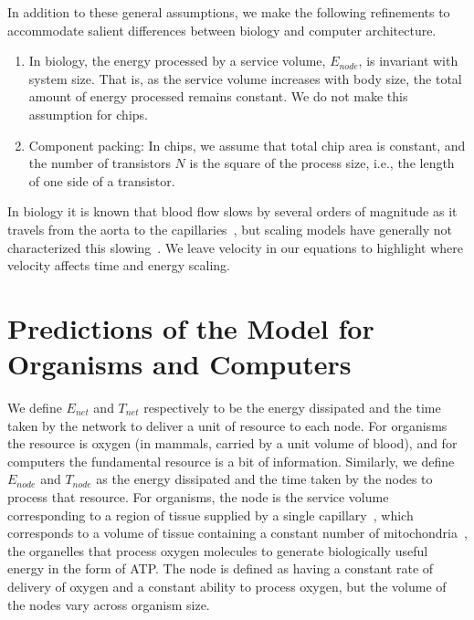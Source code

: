 \documentclass[12pt]{article}
\begin{document}
In addition to these general assumptions, we make the following
refinements to accommodate salient differences between biology and computer architecture.
\begin{enumerate}
\item In biology, the energy processed by a service volume,
  $E_{node}$, is invariant with system size. That is, as the service volume
  increases with body size, the total amount of energy processed
  remains constant.   We do not make this assumption for chips.

\item Component packing: In chips, we assume that total chip area is constant, and the
  number of transistors $N$ is the square of the process size, i.e.,
  the length of one side of a transistor. 

\end{enumerate}

\noindent 

In biology it is known that blood flow slows by several orders of magnitude as
it travels from the aorta to the capillaries~\cite{west97}, but scaling models
have generally not characterized this slowing~\cite{west97, banavar10}. We leave velocity in
our equations to highlight where velocity affects time and energy
scaling.

\section{Predictions of the Model for Organisms and Computers}

We define $E_{net}$ and $T_{net}$ respectively to be the energy dissipated and
the time taken by the network to deliver a unit of resource to each node.  For
organisms the resource is oxygen (in mammals, carried by a unit volume of
blood), and for computers the fundamental resource is a bit of information.
Similarly, we define $E_{node}$ and $T_{node}$ as the energy dissipated and the
time taken by the nodes to process that resource.  For organisms, the node is
the service volume corresponding to a region of tissue supplied by a single
capillary~\cite{banavar10}, which corresponds to a volume of tissue containing a constant number
of mitochondria~\cite{west2002allometric}, the organelles that process oxygen molecules to generate
biologically useful energy in the form of ATP.  The node is defined as having a constant
rate of delivery of oxygen and a constant ability to process oxygen, but the
volume of the nodes vary across organism size. 
\end{document}
